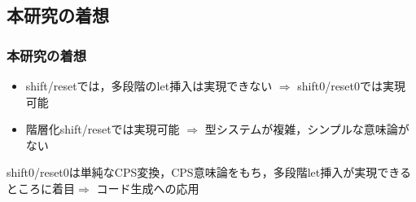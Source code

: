 \documentclass[dvipdfmx,cjk,xcolor=dvipsnames,envcountsect,notheorems,12pt,handout]{beamer} \usepackage{pgfpages} \pgfpagesuselayout{4 on 1}[a4paper,landscape,border shrink=5mm]
\theoremstyle{definition}
\begin{document}
\subsection{本研究の着想}
\begin{frame}
  \frametitle{本研究の着想}
  \begin{itemize}
  \item shift/resetでは，多段階のlet挿入は実現できない $\Rightarrow$ shift0/reset0では実現可能
  \item 階層化shift/resetでは実現可能 $\Rightarrow$ 型システムが複雑，シンプルな意味論がない
  \end{itemize}

  \pause
  shift0/reset0は単純なCPS変換，CPS意味論をもち，多段階let挿入が実現できるところに着目$\Rightarrow$ コード生成への応用


\end{frame}





\end{document}
